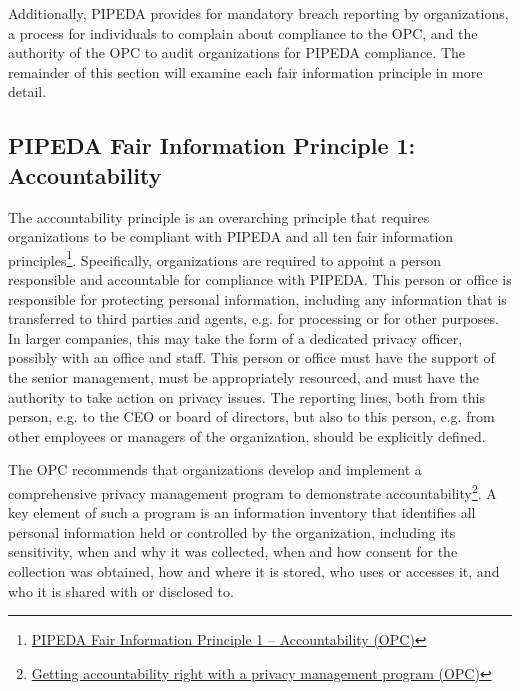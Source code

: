 Additionally, PIPEDA provides for mandatory breach reporting by organizations, a process for individuals to complain about compliance to the OPC, and the authority of the OPC to audit organizations for PIPEDA compliance. The remainder of this section will examine each fair information principle in more detail.

\subsection*{PIPEDA Fair Information Principle 1: Accountability}

The accountability principle is an overarching principle that requires organizations to be compliant with PIPEDA and all ten fair information principles\footnote{\href{https://www.priv.gc.ca/en/privacy-topics/privacy-laws-in-canada/the-personal-information-protection-and-electronic-documents-act-pipeda/p_principle/principles/p_accountability/}{PIPEDA Fair Information Principle 1 -- Accountability (OPC)}}. Specifically, organizations are required to appoint a person responsible and accountable for compliance with PIPEDA. This person or office is responsible for protecting personal information, including any information that is transferred to third parties and agents, e.g. for processing or for other purposes. In larger companies, this may take the form of a dedicated privacy officer, possibly with an office and staff. This person or office must have the support of the senior management, must be appropriately resourced, and must have the authority to take action on privacy issues. The reporting lines, both from this person, e.g. to the CEO or board of directors, but also to this person, e.g. from other employees or managers of the organization, should be explicitly defined. 

The OPC recommends that organizations develop and implement a comprehensive privacy management program to demonstrate accountability\footnote{\href{https://www.priv.gc.ca/en/privacy-topics/privacy-laws-in-canada/the-personal-information-protection-and-electronic-documents-act-pipeda/pipeda-compliance-help/pipeda-compliance-and-training-tools/gl_acc_201204/}{Getting accountability right with a privacy management program (OPC)}}. A key element of such a program is an information inventory that identifies all personal information held or controlled by the organization, including its sensitivity, when and why it was collected, when and how consent for the collection was obtained, how and where it is stored, who uses or accesses it, and who it is shared with or disclosed to.

